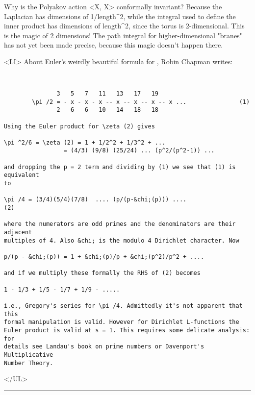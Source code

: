 Why is the Polyakov action <X, \Delta X> conformally invariant?
Because the Laplacian has dimensions of 1/length^{2}, 
while the integral
used to define the inner product has dimensions of length^{2}, 
since the
torus is 2-dimensional.  This is the magic of 2 dimensions!  The path
integral for higher-dimensional "branes" has not yet been made
precise, because this magic doesn't happen there.

<LI>
About Euler's weirdly beautiful formula for \pi , Robin Chapman writes:

\begin{verbatim}


               3   5   7   11   13   17   19
        \pi /2 = - x - x - x -- x -- x -- x -- x ...               (1)
               2   6   6   10   14   18   18

Using the Euler product for \zeta (2) gives

\pi ^2/6 = \zeta (2) = 1 + 1/2^2 + 1/3^2 + ...
                 = (4/3) (9/8) (25/24) ... (p^2/(p^2-1)) ...

and dropping the p = 2 term and dividing by (1) we see that (1) is equivalent
to

\pi /4 = (3/4)(5/4)(7/8)  .... (p/(p-&chi;(p))) ....                  (2)

where the numerators are odd primes and the denominators are their adjacent
multiples of 4. Also &chi; is the modulo 4 Dirichlet character. Now

p/(p - &chi;(p)) = 1 + &chi;(p)/p + &chi;(p^2)/p^2 + .... 

and if we multiply these formally the RHS of (2) becomes

1 - 1/3 + 1/5 - 1/7 + 1/9 - .....

i.e., Gregory's series for \pi /4. Admittedly it's not apparent that this
formal manipulation is valid. However for Dirichlet L-functions the
Euler product is valid at s = 1. This requires some delicate analysis: for
details see Landau's book on prime numbers or Davenport's Multiplicative
Number Theory.

\end{verbatim}
    
</UL>


 \par\noindent\rule{\textwidth}{0.4pt}

